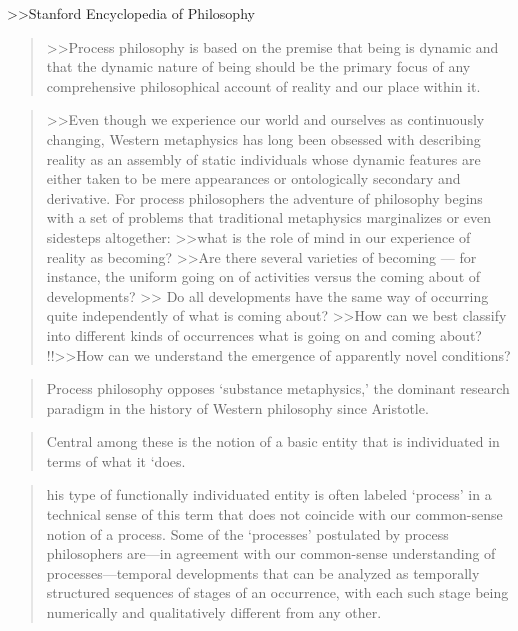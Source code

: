 \documentclass[a4paper]{Thesis}
\begin{document}
>>Stanford Encyclopedia of Philosophy
\begin{quotation}
	>>Process philosophy is based on the premise that being is dynamic and that the dynamic nature of being should be the primary focus of any comprehensive philosophical account of reality and our place within it. 
\end{quotation}

\begin{quotation}
	>>Even though we experience our world and ourselves as continuously changing, Western metaphysics has long been obsessed with describing reality as an assembly of static individuals whose dynamic features are either taken to be mere appearances or ontologically secondary and derivative. 
	For process philosophers the adventure of philosophy begins with a set of problems that traditional metaphysics marginalizes or even sidesteps altogether: 
	>>what is the role of mind in our experience of reality as becoming? 
	>>Are there several varieties of becoming — for instance, the uniform going on of activities versus the coming about of developments? 
	>> Do all developments have the same way of occurring quite independently of what is coming about? 
	>>How can we best classify into different kinds of occurrences what is going on and coming about? 
	!!>>How can we understand the emergence of apparently novel conditions?
	
\end{quotation}

\begin{quotation}
	Process philosophy opposes ‘substance metaphysics,’ the dominant research paradigm in the history of Western philosophy since Aristotle.
\end{quotation}

\begin{quotation}
	Central among these is the notion of a basic entity that is individuated in terms of what it ‘does.
\end{quotation}

\begin{quotation}
	his type of functionally individuated entity is often labeled ‘process’ in a technical sense of this term that does not coincide with our common-sense notion of a process. Some of the ‘processes’ postulated by process philosophers are—in agreement with our common-sense understanding of processes—temporal developments that can be analyzed as temporally structured sequences of stages of an occurrence, with each such stage being numerically and qualitatively different from any other.
\end{quotation}
\end{document}
